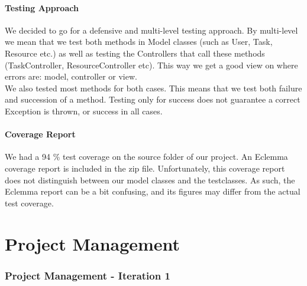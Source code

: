		\subsection{Testing Approach}
		We decided to go for a defensive and multi-level testing approach.
		By multi-level we mean that we test both methods in Model classes (such as User, Task, Resource etc.) as well as testing the Controllers that call these methods (TaskController, ResourceController etc). 
		This way we get a good view on where errors are: model, controller or view.\\
		We also tested most methods for both cases. This means that we test both failure and succession of a method. Testing only for success does not guarantee a correct Exception is thrown, or success in all cases.
		\subsection{Coverage Report}
		We had a 94 \% test coverage on the source folder of our project. An Eclemma coverage report is included in the zip file. Unfortunately, this coverage report does not distinguish between our model classes and the testclasses. As such, the Eclemma report can be a bit confusing, and its figures may differ from the actual test coverage.
	
	\part{Project Management}
	
	\section{Project Management - Iteration 1}
